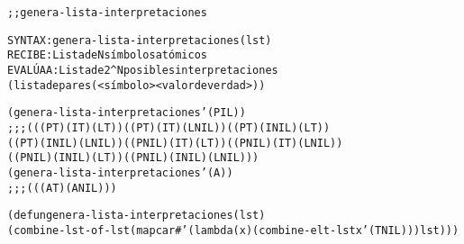 \begin{aibox}{\function}
\begin{alltt}
;; genera-lista-interpretaciones

SYNTAX: genera-lista-interpretaciones (lst) 
RECIBE   : Lista de N símbolos atómicos
EVALÚA A : Lista de 2^N posibles interpretaciones
             (lista de pares (<símbolo> <valor de verdad>))

\end{alltt}
\end{aibox}

\begin{aibox}{\examples}
\begin{alltt}
(genera-lista-interpretaciones '(P I L))
;;; (((P T) (I T) (L T)) ((P T) (I T) (L NIL)) ((P T) (I NIL) (L T))
 ((P T) (I NIL) (L NIL)) ((P NIL) (I T) (L T)) ((P NIL) (I T) (L NIL))
 ((P NIL) (I NIL) (L T)) ((P NIL) (I NIL) (L NIL)))
 (genera-lista-interpretaciones '(A))
;;; (((A T) (A NIL)))
\end{alltt}

\end{aibox}

\begin{aibox}{\comments}

\end{aibox}
\begin{aibox}{\pseudocode}
\begin{alltt}

\end{alltt}
\end{aibox}
\begin{aibox}{\code}

\begin{alltt}

(defun genera-lista-interpretaciones (lst) 
    (combine-lst-of-lst (mapcar #'(lambda (x) (combine-elt-lst x '(T NIL))) lst)))

\end{alltt}
\end{aibox}
